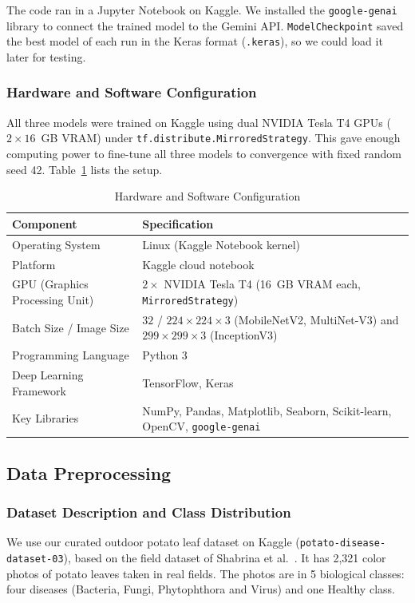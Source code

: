 The code ran in a Jupyter Notebook on Kaggle. We installed the \texttt{google-genai} library to connect the trained model to the Gemini API. \texttt{ModelCheckpoint} saved the best model of each run in the Keras format (\texttt{.keras}), so we could load it later for testing.

\subsubsection{Hardware and Software Configuration}
All three models were trained on Kaggle using dual NVIDIA Tesla T4 GPUs ($2 \times 16$~GB VRAM) under \texttt{tf.distribute.MirroredStrategy}. This gave enough computing power to fine-tune all three models to convergence with fixed random seed 42. Table~\ref{tab:hw_sw} lists the setup.

\begin{table}[htbp]
\caption{Hardware and Software Configuration}
\label{tab:hw_sw}
\begin{center}
\begin{tabularx}{\textwidth}{| p{4.8cm} | X |}
\hline
\textbf{Component} & \textbf{Specification} \\
\hline
Operating System & Linux (Kaggle Notebook kernel) \\
\hline
Platform & Kaggle cloud notebook \\
\hline
GPU (Graphics Processing Unit) & $2 \times$ NVIDIA Tesla T4 (16~GB VRAM each, \texttt{MirroredStrategy}) \\
\hline
Batch Size / Image Size & $32$ / $224 \times 224 \times 3$ (MobileNetV2, MultiNet-V3) and $299 \times 299 \times 3$ (InceptionV3) \\
\hline
Programming Language & Python 3 \\
\hline
Deep Learning Framework & TensorFlow, Keras \cite{abadi2016tensorflow} \\
\hline
Key Libraries & NumPy, Pandas, Matplotlib, Seaborn, Scikit-learn, OpenCV, \texttt{google-genai} \\
\hline
\end{tabularx}
\end{center}
\end{table}

\subsection{Data Preprocessing}

\subsubsection{Dataset Description and Class Distribution}
We use our curated outdoor potato leaf dataset on Kaggle (\texttt{potato-disease-dataset-03}), based on the field dataset of Shabrina et al.\ \cite{shabrina2024novel}. It has 2,321 color photos of potato leaves taken in real fields. The photos are in 5 biological classes: four diseases (Bacteria, Fungi, Phytophthora and Virus) and one Healthy class.

